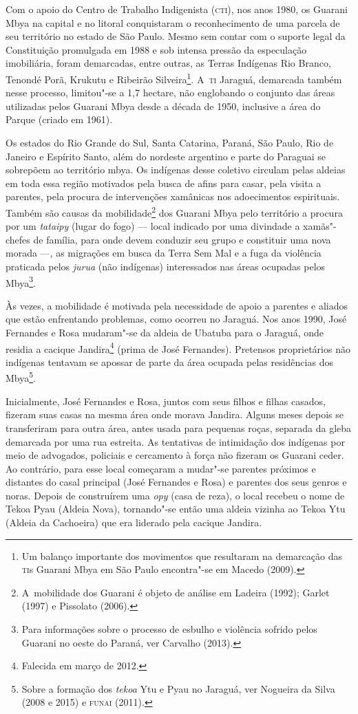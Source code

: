 Com o apoio do Centro de Trabalho Indigenista (\textsc{cti}), nos anos 1980, os
Guarani Mbya na capital e no litoral conquistaram o reconhecimento de
uma parcela de seu território no estado de São Paulo. Mesmo sem contar
com o suporte legal da Constituição promulgada em 1988 e sob intensa
pressão da especulação imobiliária, foram demarcadas, entre outras, as
Terras Indígenas Rio Branco, Tenondé Porã, Krukutu e Ribeirão
Silveira\footnote{Um balanço importante dos movimentos que resultaram
na demarcação das \textsc{ti}s Guarani Mbya em São Paulo encontra"-se em Macedo
(2009).}. A~\textsc{ti} Jaraguá, demarcada também nesse processo, limitou"-se a
1,7 hectare, não englobando o conjunto das áreas utilizadas pelos
Guarani Mbya desde a década de 1950, inclusive a área do Parque (criado
em 1961).

Os estados do Rio Grande do Sul, Santa Catarina, Paraná, São Paulo, Rio
de Janeiro e Espírito Santo, além do nordeste argentino e parte do
Paraguai se sobrepõem ao território mbya. Os indígenas desse coletivo
circulam pelas aldeias em toda essa região motivados pela busca de
afins para casar, pela visita a parentes, pela procura de intervenções
xamânicas nos adoecimentos espirituais. Também são causas da
mobilidade\footnote{A~mobilidade dos Guarani é objeto de análise em
Ladeira (1992); Garlet (1997) e Pissolato (2006).} dos Guarani Mbya
pelo território a procura por um \emph{tataipy} (lugar do fogo) --- local
indicado por uma divindade a xamãs"-chefes de família, para onde devem
conduzir seu grupo e constituir uma nova morada ---, as migrações em
busca da Terra Sem Mal e a fuga da violência praticada pelos \emph{jurua}
(não indígenas) interessados nas áreas ocupadas pelos Mbya\footnote{Para
informações sobre o processo de esbulho e violência sofrido pelos
Guarani no oeste do Paraná, ver Carvalho (2013).}.

Às vezes, a mobilidade é motivada pela necessidade de apoio a parentes e
aliados que estão enfrentando problemas, como ocorreu no Jaraguá. Nos
anos 1990, José Fernandes e Rosa mudaram"-se da aldeia de Ubatuba para o
Jaraguá, onde residia a cacique Jandira\footnote{Falecida em março de
2012.} (prima de José Fernandes). Pretensos proprietários não indígenas
tentavam se apossar de parte da área ocupada pelas residências dos
Mbya\footnote{Sobre a formação dos \emph{tekoa} Ytu e Pyau no Jaraguá, ver
Nogueira da Silva (2008 e 2015) e \textsc{funai} (2011).}. 

Inicialmente, José Fernandes e Rosa, juntos com seus filhos e filhas
casados, fizeram suas casas na mesma área onde morava Jandira. Alguns
meses depois se transferiram para outra área, antes usada para pequenas
roças, separada da gleba demarcada por uma rua estreita. As tentativas
de intimidação dos indígenas por meio de advogados, policiais e
cercamento à força não fizeram os Guarani ceder. Ao contrário, para
esse local começaram a mudar"-se parentes próximos e distantes do casal
principal (José Fernandes e Rosa) e parentes dos seus genros e noras.
Depois de construírem uma \emph{opy} (casa de reza), o local recebeu o nome de
Tekoa Pyau (Aldeia Nova), tornando"-se então uma aldeia vizinha ao Tekoa
Ytu (Aldeia da Cachoeira) que era liderado pela cacique Jandira.

